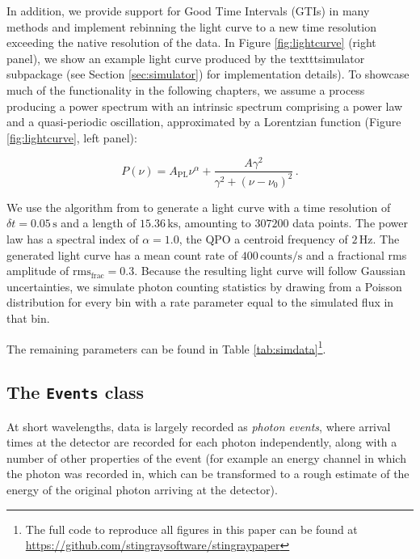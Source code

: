 \documentclass[12pt]{emulateapj}
\begin{document}
In addition, we provide support for Good Time Intervals (GTIs) in many methods and implement rebinning the light curve to a new time resolution exceeding the native resolution of the data. In Figure \ref{fig:lightcurve} (right panel), we show an example light curve produced by the texttt{simulator} subpackage (see Section \ref{sec:simulator}) for implementation details). To showcase much of the functionality in the following chapters, we assume a process producing a power spectrum with an intrinsic spectrum comprising a power law and a quasi-periodic oscillation, approximated by a Lorentzian function (Figure \ref{fig:lightcurve}, left panel):

\[
P(\nu) = A_{\mathrm{PL}} \nu^{\alpha} + \frac{A \gamma^2}{\gamma^2 + (\nu - \nu_0)^2} \, .
\]

We use the algorithm from \citet{timmer1995} to generate a light curve with a time resolution of $\delta t = 0.05\,\mathrm{s}$ and a length of $15.36 \,\mathrm{ks}$, amounting to $307200$ data points. The power law has a spectral index of $\alpha = 1.0$, the QPO a centroid frequency of $2 \,\mathrm{Hz}$. The generated light curve has a mean count rate of $400\,\mathrm{counts/s}$ and a fractional rms amplitude of $\mathrm{rms}_\mathrm{frac} = 0.3$. Because the resulting light curve will follow Gaussian uncertainties, we simulate photon counting statistics by drawing from a Poisson distribution for every bin with a rate parameter equal to the simulated flux in that bin. 

The remaining parameters can be found in Table \ref{tab:simdata}\footnote{The full code to reproduce all figures in this paper can be found at \url{https://github.com/stingraysoftware/stingraypaper}}. 

\subsection{The \texttt{Events} class}

At short wavelengths, data is largely recorded as \textit{photon events}, where arrival times at the detector are recorded for each photon independently, along with a number of other properties of the event (for example an energy channel in which the photon was recorded in, which can be transformed to a rough estimate of the energy of the original photon arriving at the detector).
\end{document}
